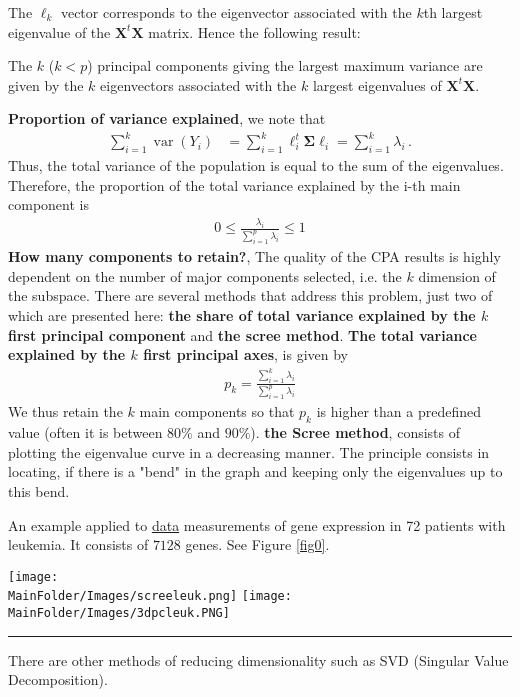 The $\ell_k$ vector corresponds to the eigenvector associated with the $k$th largest eigenvalue of the $\mathbf{X}^t \mathbf{X}$ matrix. Hence the following result:
\begin{lemma}
The $k$ ($k<p$) principal components giving the largest maximum variance are given by the $k$ eigenvectors associated with the $k$ largest eigenvalues of $\mathbf{X}^t \mathbf{X}$.
\end{lemma}
\textbf{Proportion of variance explained}, we note that 
\begin{align*}
\sum_{i=1}^{k}\operatorname{var}\left(Y_{i}\right) &=\sum_{i=1}^{k}\ell_{i}^{t} \boldsymbol{\Sigma} \ell_{i}=\sum_{i=1}^{k}\lambda_i \,.
\end{align*}
Thus, the total variance of the population is equal to the sum of the eigenvalues. Therefore, the proportion of the total variance explained by the i-th main component is 
\begin{align*}
0\leq \frac{\lambda_i}{\sum_{i=1}^{p}\lambda_i }\leq 1
\end{align*}
\textbf{How many components to retain?}, 
The quality of the CPA results is highly dependent on the number of major components selected, i.e. the $k$ dimension of the subspace. There are several methods that address this problem, just two of which are presented here: \textbf{the share of total variance explained by the $k$ first principal component} and \textbf{the scree method}.
\textbf{The total variance explained by the $k$ first principal axes}, is given by 
\begin{align*}
p_k=\frac{\sum_{i=1}^{k} \lambda_i}{\sum_{i=1}^{p}\lambda_i }
\end{align*}
We thus retain the $k$ main components so that $p_k$ is higher than a predefined value (often it is between $80\%$ and $90\%$). \newl
\textbf{the Scree method}, consists of plotting the eigenvalue curve in a decreasing manner. The principle consists in locating, if there is a "bend" in the graph and keeping only the eigenvalues up to this bend.
\begin{example}
An example applied to \href{1http://web.stanford.edu/ hastie/CASIles/DATA/leukemia big.csv}{data} measurements of gene expression in 72 patients with leukemia. It consists of $7128$ genes. See Figure \ref{fig0}.
\begin{figure*}[t]
    \centering
     \texttt{[image: \\MainFolder/Images/screeleuk.png]}
    \texttt{[image: \\MainFolder/Images/3dpcleuk.PNG]}
    \caption{Screeplot (left), 3-component data projection (right)}\hrule
    \label{fig0}
\end{figure*}
\end{example}
\noindent There are other methods of reducing dimensionality such as SVD (Singular Value Decomposition).
%
%

